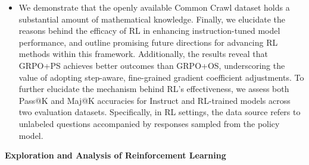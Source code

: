 \begin{itemize}[topsep=0pt]
    \item We demonstrate that the openly available Common Crawl dataset holds a substantial amount of mathematical knowledge. Finally, we elucidate the reasons behind the efficacy of RL in enhancing instruction-tuned model performance, and outline promising future directions for advancing RL methods within this framework. Additionally, the results reveal that GRPO+PS achieves better outcomes than GRPO+OS, underscoring the value of adopting step-aware, fine-grained gradient coefficient adjustments. To further elucidate the mechanism behind RL's effectiveness, we assess both Pass@K and Maj@K accuracies for Instruct and RL-trained models across two evaluation datasets. Specifically, in RL settings, the data source refers to unlabeled questions accompanied by responses sampled from the policy model. \end{itemize}

\textbf{Exploration and Analysis of Reinforcement Learning}

